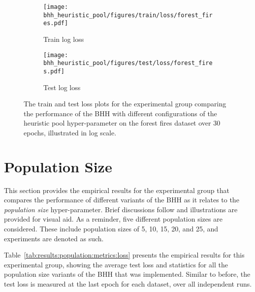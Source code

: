 \begin{figure}[htb]
	\begin{subfigure}{0.5\textwidth}
		\centering
		\texttt{[image: bhh\_heuristic\_pool/figures/train/loss/forest\_fires.pdf]}
		\caption{Train log loss}
		\label{fig:results:heuristic_pool:figures:loss:train:forest_fires}
	\end{subfigure}
	\begin{subfigure}{0.5\textwidth}
		\centering
		\texttt{[image: bhh\_heuristic\_pool/figures/test/loss/forest\_fires.pdf]}
		\caption{Test log loss}
		\label{fig:results:heuristic_pool:figures:loss:test:forest_fires}
	\end{subfigure}
	\par\bigskip
	\caption{The train and test loss plots for the experimental group comparing the performance of the \acs{BHH} with different configurations of the heuristic pool hyper-parameter on the forest fires dataset over 30 epochs, illustrated in log scale.}
	\label{fig:results:heuristic_pool:figures:forest_fires}
\end{figure}



\section{Population Size}\label{sec:results:population}

This section provides the empirical results for the experimental group that compares the performance of different variants of the \acs{BHH} as it relates to the \textit{population size} hyper-parameter. Brief discussions follow and illustrations are provided for visual aid. As a reminder, five different population sizes are considered. These include population sizes of 5, 10, 15, 20, and 25, and experiments are denoted as such.

Table~\ref{tab:results:population:metrics:loss} presents the empirical results for this experimental group, showing the average test loss and statistics for all the population size variants of the \acs{BHH} that was implemented. Similar to before, the test loss is measured at the last epoch for each dataset, over all independent runs.

